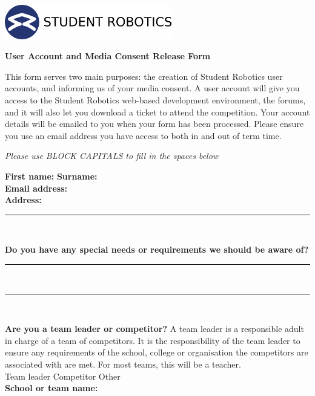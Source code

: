 \documentclass[a4paper,12pt]{article}
\newcommand{\checkbox}[1]{#1\hspace{0.2cm}\raisebox{-0.3mm}{$\square$}}
\newcommand{\textfield}[1]{\textbf{#1:} \hrulefill\hspace{0mm}}
\newcommand{\fieldsep}{\\[2.5mm]}
\newcommand{\textfieldline}{{\hrule\hspace{2mm}\fieldsep}}
\begin{document}
\begin{minipage}[c]{0.38\textwidth}
\includegraphics[height=1.5cm]{logo}
\end{minipage}
\hspace{0.12\textwidth}
\begin{minipage}[c]{0.48\textwidth}
\begin{center}
{\LARGE \textbf{User Account and Media Consent Release Form} \par}
\end{center}
\end{minipage}
\vspace{1cm}

This form serves two main purposes: the creation of Student Robotics user accounts, and informing us of your media consent.
A user account will give you access to the Student Robotics web-based development environment, the forums, and it will also let you download a ticket to attend the competition.
Your account details will be emailed to you when your form has been processed.
Please ensure you use an email address you have access to both in and out of term time.

\begin{center}
\textit{Please use BLOCK CAPITALS to fill in the spaces below}
\end{center}

\textfield{First name}  \textfield{Surname} \fieldsep
\textfield{Email address} \fieldsep
\textfield{Address} \fieldsep
\textfieldline

\textbf{Do you have any special needs or requirements we should be aware of?}
\fieldsep \textfieldline \textfieldline

\textbf{Are you a team leader or competitor?}
A team leader is a responsible adult in charge of a team of competitors.
It is the responsibility of the team leader to ensure any requirements of the school, college or organisation the competitors are associated with are met.
For most teams, this will be a teacher.\\[2mm]
\checkbox{Team leader} \hspace{1.5cm} \checkbox{Competitor} \hspace{1.5cm} \checkbox{Other} \\

\textfield{School or team name} \fieldsep
\end{document}
